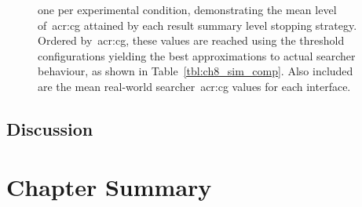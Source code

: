 \begin{figure}[t!]
    \centering
    \caption[Comparison~\gls{acr:cg} rankings (diversification)]{ one per experimental condition, demonstrating the mean level of~\gls{acr:cg} attained by each result summary level stopping strategy. Ordered by~\gls{acr:cg}, these values are reached using the threshold configurations yielding the best approximations to actual searcher behaviour, as shown in Table~\ref{tbl:ch8_sim_comp}. Also included are the mean real-world searcher~\gls{acr:cg} values for each interface.}
    \label{fig:ch7_sim_comparison_rankings}
\end{figure}

\subsection{Discussion}

\section{Chapter Summary}
